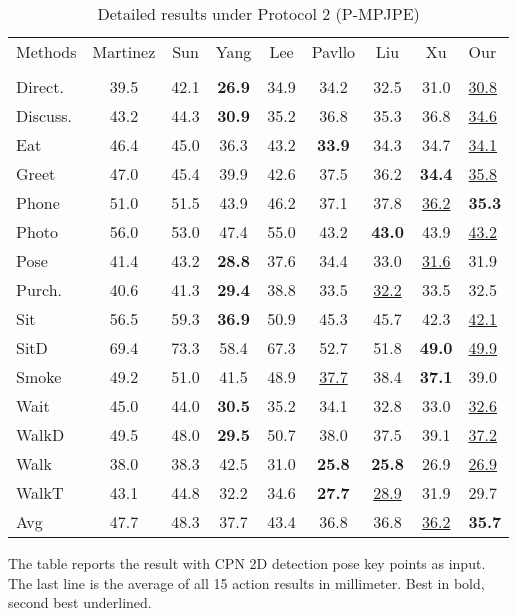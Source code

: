 \documentclass[runningheads]{llncs}
\begin{document}
\begin{table}[!htp]
\centering
\caption{Detailed results under Protocol 2 (P-MPJPE)}\label{tab2}
\setlength{\tabcolsep}{7.5pt} \renewcommand{\arraystretch}{1} \begin{threeparttable}
\begin{tabular}{|l|ccccccc|l|}
\hline 
Methods & Martinez& Sun & Yang & Lee & Pavllo & Liu & Xu&Our\\
& \cite{MartinezHRL17}&\cite{Sun_2017_ICCV}&\cite{Yang_2018_CVPR}&\cite{Lee_2018_ECCV}&\cite{temporal_convolutions_and_semi_supervised}&\cite{Liu_2020_CVPR}&\cite{Xu_2020_CVPR}&\\
\hline
Direct.&39.5&42.1&\textbf{26.9}&34.9&34.2&32.5&31.0&\underline{30.8}\\
Discuss.&43.2& 44.3& \textbf{30.9}&35.2& 36.8&35.3&36.8&\underline{34.6}\\
Eat& 46.4& 45.0&36.3&43.2&\textbf{33.9}&34.3&34.7&\underline{34.1}\\
Greet&47.0& 45.4& 39.9&42.6&37.5& 36.2&\textbf{34.4}&\underline{35.8}\\
Phone & 51.0&51.5& 43.9& 46.2& 37.1&37.8&\underline{36.2}&\textbf{35.3}\\
Photo &56.0& 53.0& 47.4& 55.0&43.2&\textbf{43.0}&43.9&\underline{43.2}\\
Pose & 41.4&43.2&\textbf{28.8}& 37.6& 34.4& 33.0&\underline{31.6}&31.9\\
Purch. &40.6&41.3&\textbf{29.4}& 38.8& 33.5&\underline{32.2}&33.5&32.5\\
Sit&56.5&59.3& \textbf{36.9}& 50.9&45.3&45.7&42.3&\underline{42.1}\\
SitD & 69.4&73.3&58.4& 67.3&  52.7& 51.8&\textbf{49.0}&\underline{49.9}\\
Smoke & 49.2& 51.0&41.5& 48.9&\underline{37.7}& 38.4&\textbf{37.1}&39.0\\
Wait & 45.0& 44.0&\textbf{30.5}&35.2&34.1&32.8&33.0&\underline{32.6}\\
WalkD & 49.5&48.0&\textbf{29.5}&50.7& 38.0&37.5&39.1&\underline{37.2}\\
Walk & 38.0&38.3&42.5&31.0& \textbf{25.8}&\textbf{25.8}&26.9&\underline{26.9}\\
WalkT & 43.1&44.8&32.2&34.6&\textbf{27.7}& \underline{28.9}&31.9&29.7\\
\hline
Avg&47.7&48.3&37.7&43.4&36.8&36.8&\underline{36.2}&\textbf{35.7}\\

\hline
\end{tabular}
\begin{tablenotes}
        \footnotesize
        \item *The table reports the result with CPN 2D detection pose key points as input. The last line is the average of all 15 action results in millimeter. Best in bold, second best underlined.
\end{tablenotes}
\end{threeparttable}
\end{table}
\end{document}

